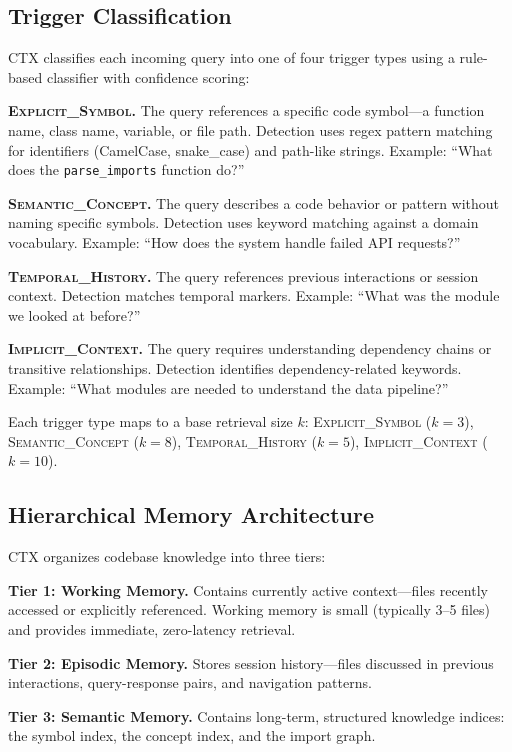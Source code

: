 \documentclass[11pt]{article}
\begin{document}
\subsection{Trigger Classification}

CTX classifies each incoming query into one of four trigger types using a rule-based classifier with confidence scoring:

\textbf{\textsc{Explicit\_Symbol}.} The query references a specific code symbol---a function name, class name, variable, or file path. Detection uses regex pattern matching for identifiers (CamelCase, snake\_case) and path-like strings. Example: ``What does the \texttt{parse\_imports} function do?''

\textbf{\textsc{Semantic\_Concept}.} The query describes a code behavior or pattern without naming specific symbols. Detection uses keyword matching against a domain vocabulary. Example: ``How does the system handle failed API requests?''

\textbf{\textsc{Temporal\_History}.} The query references previous interactions or session context. Detection matches temporal markers. Example: ``What was the module we looked at before?''

\textbf{\textsc{Implicit\_Context}.} The query requires understanding dependency chains or transitive relationships. Detection identifies dependency-related keywords. Example: ``What modules are needed to understand the data pipeline?''

Each trigger type maps to a base retrieval size $k$: \textsc{Explicit\_Symbol} ($k=3$), \textsc{Semantic\_Concept} ($k=8$), \textsc{Temporal\_History} ($k=5$), \textsc{Implicit\_Context} ($k=10$).

\subsection{Hierarchical Memory Architecture}

CTX organizes codebase knowledge into three tiers:

\textbf{Tier 1: Working Memory.} Contains currently active context---files recently accessed or explicitly referenced. Working memory is small (typically 3--5 files) and provides immediate, zero-latency retrieval.

\textbf{Tier 2: Episodic Memory.} Stores session history---files discussed in previous interactions, query-response pairs, and navigation patterns.

\textbf{Tier 3: Semantic Memory.} Contains long-term, structured knowledge indices: the symbol index, the concept index, and the import graph.
\end{document}
